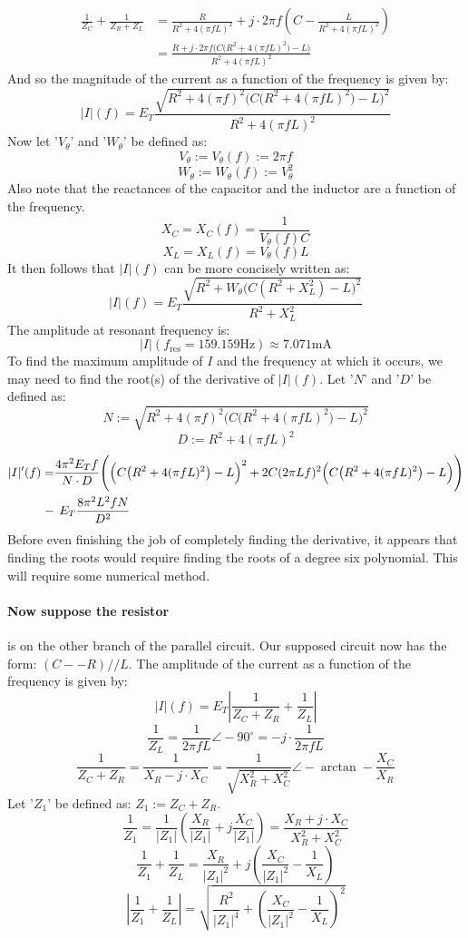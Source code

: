\documentclass{article}
\begin{document}
	\begin{align*}
		\frac{1}{Z_C} + \frac{1}{Z_R + Z_L} &= \frac{R}{R^2+4(\pi f L)^2} + j 
		\cdot 2 \pi f\left(C - \frac{L}{R^2+4(\pi f L)^2}  \right) \\
		 &= \frac{R + j \cdot 2\pi f \Big(C\big(R^2+4(\pi f L)^2\big) - 
		 L\Big)}{R^2+4(\pi f L)^2}
	\end{align*}
	And so the magnitude of the current as a function of the frequency is given 
	by:
	$$ |I|(f) = E_T \frac{\sqrt{R^2 + 4(\pi f)^2\Big(C\big(R^2+4(\pi f 
	L)^2\big) - L\Big)^2}}{R^2+4(\pi f L)^2}$$
	Now let '$V_\theta$' and '$W_\theta$' be defined as:
	$$ V_\theta:=V_\theta(f):=2\pi f$$
	$$ W_\theta:=W_\theta(f):=V_\theta^2$$
	Also note that the reactances of the capacitor and the inductor are a 
	function of the frequency.
	$$ X_C = X_C(f) = \frac{1}{V_\theta (f)C}$$
	$$ X_L = X_L(f) = V_\theta (f)L$$ 
	It then follows that $|I|(f)$ can be more concisely written as:
	$$ |I|(f) = E_T \frac{\sqrt{R^2 + W_\theta\big(C(R^2 +X_L^2 ) - 
	L\big)^2}}{R^2 + X_L^2}$$
	The amplitude at resonant frequency is:
	$$ |I|(f_{\text{res}}=159.159 \text{Hz}) \approx 7.071 \text{mA}$$
	To find the maximum amplitude of $I$ and the frequency at which it occurs, 
	we may need to find the root(s) of the derivative of $|I|(f)$.
	Let '$N$' and '$D$' be defined as:
	$$ N:=\sqrt{R^2 + 4(\pi f)^2\Big(C\big(R^2+4(\pi f 
		L)^2\big) - L\Big)^2}$$
	$$ D:=R^2+4(\pi f L)^2$$
	\begin{align*}
		|I|'(f) =&\frac {4\pi^2 E_T f}{N\cdot D} \Bigg(\Big(C\big(R^2+4(\pi f 
		L)^2\big) - L\Big)^2 +  2C(2\pi Lf)^2\Big(C\big(R^2+4(\pi f 
		L)^2\big) - L\Big)\Bigg) \\
		 -& \hspace{1ex}E_T \frac{8\pi^2L^2 f N}{D^2}
	\end{align*}
	Before even finishing the job of completely finding the derivative, it 
	appears that finding the roots would require finding the roots of a degree 
	six polynomial.  This will require some numerical method.
	\paragraph[Swap]{Now suppose the resistor} is on the other branch of the 
	parallel circuit.  Our supposed circuit now has the form: $(C--R)//L$.  The 
	amplitude of the current as a function of the 
	frequency is given by:
	$$ |I|(f) = E_T\left| \frac{1}{Z_C+Z_R} + \frac{1}{Z_L} \right|$$
	$$ \frac{1}{Z_L} = \frac{1}{2\pi f L}\angle-90^{\circ} = - j\cdot 
	\frac{1}{2\pi f L}$$
	$$ \frac{1}{Z_C + Z_R} = \frac{1}{X_R - j \cdot X_C} =  
	\frac{1}{\sqrt{X_R^2 + X_C^2}}\angle-\arctan -\frac{X_C}{X_R}$$
	Let '$Z_1$' be defined as: $Z_1:=Z_C+Z_R$.
	$$ \frac{1}{Z_1} = \frac{1}{|Z_1|} \left( \frac{X_R}{|Z_1|} + j 
	\frac{X_C}{|Z_1|}\right) = \frac{X_R + j \cdot X_C}{X_R^2 + X_C^2}$$
	$$ \frac{1}{Z_1} + \frac{1}{Z_L} = \frac{X_R}{|Z_1|^2} + j \left( 
	\frac{X_C}{|Z_1|^2} - \frac{1}{X_L}\right)$$
	$$ \left| \frac{1}{Z_1} + \frac{1}{Z_L} \right| = \sqrt{\frac{R^2}{|Z_1|^4} 
	+ \left(\frac{X_C}{|Z_1|^2} - \frac{1}{X_L}\right)^2}$$
\end{document}
